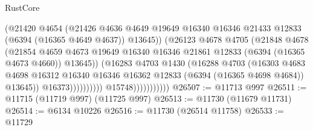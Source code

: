 \begin{lexlean}{RustCore}
\begin{coremodule}
                                          (@21420
                                            @4654
                                            (@21426
                                              @4636
                                              @4649
                                              @19649
                                              @16340
                                              @16346
                                              @21433
                                              @12833
                                              (@6394 (@16365 @4649 @4637))
                                              @13645))
                                          (@26123
                                            @4678
                                            @4705
                                            (@21848
                                              @4678
                                              (@21854
                                                @4659
                                                @4673
                                                @19649
                                                @16340
                                                @16346
                                                @21861
                                                @12833
                                                (@6394 (@16365 @4673 @4660))
                                                @13645))
                                            (@16283
                                              @4703
                                              @1430
                                              (@16288
                                                @4703
                                                (@16303
                                                  @4683
                                                  @4698
                                                  @16312
                                                  @16340
                                                  @16346
                                                  @16362
                                                  @12833
                                                  (@6394 (@16365 @4698 @4684))
                                                  @13645))
                                              @16373))))))))))
                          @15748)))))))))))
@26507 := @11713 @997
@26511 := @11715 (@11719 @997) (@11725 @997)
@26513 := @11730 (@11679 @11731)
@26514 := @6134 @10226
@26516 := @11730 (@26514 @11758)
@26533 := @11729

\end{coremodule}
\end{lexlean}
